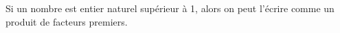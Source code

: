 Si un nombre est entier naturel supérieur à 1, alors on peut l'écrire comme un produit de facteurs premiers.